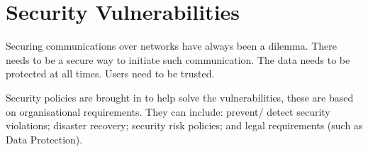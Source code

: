 \section*{Security Vulnerabilities}
Securing communications over networks have always been a dilemma. There needs to be a secure way to initiate such communication. The data needs to be protected at all times. Users need to be trusted.

Security policies are brought in to help solve the vulnerabilities, these are based on organisational requirements. They can include: prevent/ detect security violations; disaster recovery; security risk policies; and legal requirements (such as Data Protection). 